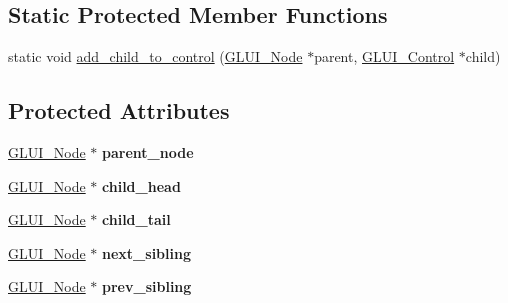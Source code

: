 \subsection*{Static Protected Member Functions}
\begin{DoxyCompactItemize}
\item 
static void \hyperlink{class_g_l_u_i___node_a52432c3a1f3783b5f47aa3ab3dae4435}{add\+\_\+child\+\_\+to\+\_\+control} (\hyperlink{class_g_l_u_i___node}{G\+L\+U\+I\+\_\+\+Node} $\ast$parent, \hyperlink{class_g_l_u_i___control}{G\+L\+U\+I\+\_\+\+Control} $\ast$child)
\end{DoxyCompactItemize}
\subsection*{Protected Attributes}
\begin{DoxyCompactItemize}
\item 
\hypertarget{class_g_l_u_i___node_a308f39e8a182f499139381840418a573}{\hyperlink{class_g_l_u_i___node}{G\+L\+U\+I\+\_\+\+Node} $\ast$ {\bfseries parent\+\_\+node}}\label{class_g_l_u_i___node_a308f39e8a182f499139381840418a573}

\item 
\hypertarget{class_g_l_u_i___node_ad9370e7f62e83bb720063d2439f544c2}{\hyperlink{class_g_l_u_i___node}{G\+L\+U\+I\+\_\+\+Node} $\ast$ {\bfseries child\+\_\+head}}\label{class_g_l_u_i___node_ad9370e7f62e83bb720063d2439f544c2}

\item 
\hypertarget{class_g_l_u_i___node_a971d8e606c1a3442ad9b8681bdb9ed59}{\hyperlink{class_g_l_u_i___node}{G\+L\+U\+I\+\_\+\+Node} $\ast$ {\bfseries child\+\_\+tail}}\label{class_g_l_u_i___node_a971d8e606c1a3442ad9b8681bdb9ed59}

\item 
\hypertarget{class_g_l_u_i___node_a2c99ef6a1290035f98871d859d05e890}{\hyperlink{class_g_l_u_i___node}{G\+L\+U\+I\+\_\+\+Node} $\ast$ {\bfseries next\+\_\+sibling}}\label{class_g_l_u_i___node_a2c99ef6a1290035f98871d859d05e890}

\item 
\hypertarget{class_g_l_u_i___node_afa72f0491ca54ce8d0a0af7049de8049}{\hyperlink{class_g_l_u_i___node}{G\+L\+U\+I\+\_\+\+Node} $\ast$ {\bfseries prev\+\_\+sibling}}\label{class_g_l_u_i___node_afa72f0491ca54ce8d0a0af7049de8049}

\end{DoxyCompactItemize}
